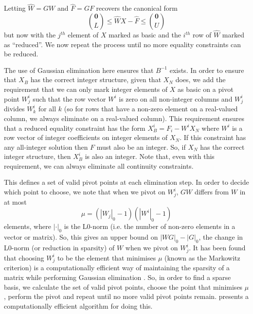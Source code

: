 \documentclass{article}
\begin{document}
Letting $\hat{W} = GW$ and $\hat{F} = GF$ recovers the canonical form
\begin{equation}
{\mathbf{0} \choose L} \le \hat{W}X - \hat{F} \le {\mathbf{0} \choose U}
\label{eliminatedConstraint}
\end{equation}
but now with the $j^{th}$ element of $X$ marked as basic and the $i^{th}$ row of $\hat{W}$ marked as ``reduced''. We now repeat the process until no more equality constraints can be reduced.

The use of Gaussian elimination here ensures that $B^{-1}$ exists. In order to ensure that $X_B$ has the correct integer structure, given that $X_N$ does, we add the requirement that we can only mark integer elements of $X$ as basic on a pivot point $W^i_j$ such that the row vector $W^i$ is zero on all non-integer columns and $W^i_j$ divides $W^i_k$ for all $k$ (so for rows that have a non-zero element on a real-valued column, we always eliminate on a real-valued column). This requirement ensures that a reduced equality constraint has the form $X_B^i = F_i - W^iX_N$ where $W^i$ is a row vector of integer coefficients on integer elements of $X_N$. If this constraint has any all-integer solution then $F$ must also be an integer. So, if $X_N$ has the correct integer structure, then $X_B^i$ is also an integer. Note that, even with this requirement, we can always eliminate all continuity constraints.

This defines a set of valid pivot points at each elimination step. In order to decide which point to choose, we note that when we pivot on $W^i_j$, $GW$ differs from $W$ in at most 
\[
\mu = (\left|W_j\right|_0-1)(\left|W^i\right|_0-1)
\]
 elements, where $\left|\cdot\right|_0$ is the L0-norm (i.e. the number of non-zero elements in a vector or matrix). So, this gives an upper bound on $\left|WG\right|_0 - \left|G\right|_0$, the change in L0-norm (or reduction in sparsity) of $W$ when we pivot on $W^i_j$. It has been found that choosing $W^i_j$ to be the element that minimises $\mu$ (known as the Markowitz criterion) is a computationally efficient way of maintaining the sparsity of a matrix while performing Gaussian elimination \citep*{markowitz1957elimination, suhl1990computing, maros2002computational}. So, in order to find a sparse basis, we calculate the set of valid pivot points, choose the point that minimises $\mu$, perform the pivot and repeat until no more valid pivot points remain. \citet{suhl1990computing} presents a computationally efficient algorithm for doing this.
\end{document}
